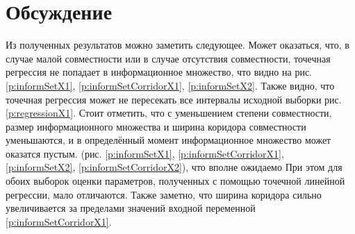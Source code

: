 \documentclass[a4paper,12pt]{article}
\begin{document}
    \section{Обсуждение}
    \quad Из полученных результатов можно заметить следующее.
    Может оказаться, что, в случае малой совместности или в случае отсутствия совместности,
    точечная регрессия не попадает в информационное множество,
    что видно на рис. \ref{p:informSetX1}, \ref{p:informSetCorridorX1}, \ref{p:informSetX2}.
    Также видно, что точечная регрессия может не пересекать все интервалы исходной выборки рис. \ref{p:regressionX1}.
    Стоит отметить, что с уменьшением степени совместности, размер информационного множества и
    ширина коридора совместности уменьшаются, и в определённый момент информационное множество может оказатся пустым.
    (рис. \ref{p:informSetX1}, \ref{p:informSetCorridorX1}, \ref{p:informSetX2}, \ref{p:informSetCorridorX2}),
    что вполне ожидаемо
    При этом для обоих выборок оценки параметров, полученных с помощью точечной линейной регрессии, мало отличаются.
    Также заметно, что ширина коридора сильно увеличивается за пределами
    значений входной переменной \ref{p:informSetCorridorX1}.
\end{document}
